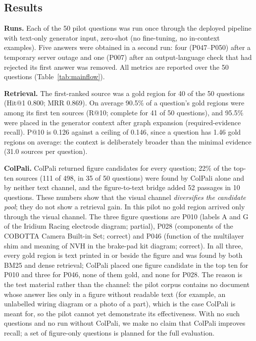 \documentclass[runningheads]{llncs}
\begin{document}
\subsection{Results}
\textbf{Runs.} Each of the 50 pilot questions was run once through the deployed pipeline with text-only generator input, zero-shot (no fine-tuning, no in-context examples). Five answers were obtained in a second run: four (P047--P050) after a temporary server outage and one (P007) after an output-language check that had rejected its first answer was removed. All metrics are reported over the 50 questions (Table~\ref{tab:mainflow}).

\textbf{Retrieval.} The first-ranked source was a gold region for 40 of the 50 questions (Hit@1 0.800; MRR 0.869). On average 90.5\% of a question's gold regions were among its first ten sources (R@10; complete for 41 of 50 questions), and 95.5\% were placed in the generator context after graph expansion (required-evidence recall). P@10 is 0.126 against a ceiling of 0.146, since a question has 1.46 gold regions on average: the context is deliberately broader than the minimal evidence (31.0 sources per question).

\textbf{ColPali.} ColPali returned figure candidates for every question; 22\% of the top-ten sources (111 of 498, in 35 of 50 questions) were found by ColPali alone and by neither text channel, and the figure-to-text bridge added 52 passages in 10 questions. These numbers show that the visual channel \emph{diversifies the candidate pool}; they do not show a retrieval gain. In this pilot no gold region arrived only through the visual channel. The three figure questions are P010 (labels A and G of the Iridium Racing electrode diagram; partial), P028 (components of the COBOTTA Camera Built-in Set; correct) and P046 (function of the multilayer shim and meaning of NVH in the brake-pad kit diagram; correct). In all three, every gold region is text printed in or beside the figure and was found by both BM25 and dense retrieval; ColPali placed one figure candidate in the top ten for P010 and three for P046, none of them gold, and none for P028. The reason is the test material rather than the channel: the pilot corpus contains no document whose answer lies only in a figure without readable text (for example, an unlabelled wiring diagram or a photo of a part), which is the case ColPali is meant for, so the pilot cannot yet demonstrate its effectiveness. With no such questions and no run without ColPali, we make no claim that ColPali improves recall; a set of figure-only questions is planned for the full evaluation.
\end{document}
